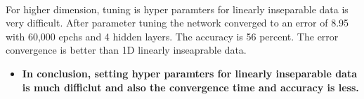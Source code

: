 \documentclass[11pt]{article}
\providecommand{\tightlist}{%
      \setlength{\itemsep}{0pt}\setlength{\parskip}{0pt}}
\begin{document}
    \begin{center}
    \end{center}
    { \hspace*{\fill} \\}
    
    For higher dimension, tuning is hyper paramters for linearly inseparable
data is very difficult. After parameter tuning the network converged to
an error of 8.95 with 60,000 epchs and 4 hidden layers. The accuracy is
56 percent. The error convergence is better than 1D linearly inseaprable
data.

\begin{itemize}
\tightlist
\item
  \textbf{In conclusion, setting hyper paramters for linearly
  inseparable data is much difficlut and also the convergence time and
  accuracy is less.}
\end{itemize}


    
    
    
    
\end{document}
